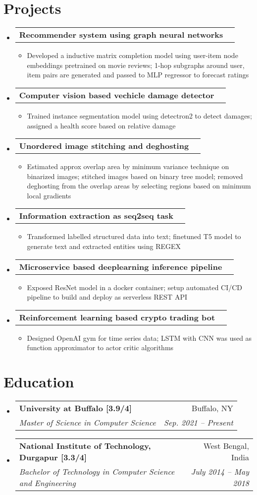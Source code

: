 \documentclass[letterpaper,10pt]{article}
\makeatletter
\newcommand{\resumeItemClean}[1]{
    \item\small{
        {#1 \vspace{-2pt}}
    }
}
\newcommand{\resumeSubheading}[4]{
  \vspace{-1pt}\item
    \begin{tabular*}{0.97\textwidth}[t]{l@{\extracolsep{\fill}}r}
      \textbf{#1} & #2 \\
      \textit{\small#3} & \textit{\small #4} \\
    \end{tabular*}\vspace{-5pt}
}
\newcommand{\projectheading}[3]{
    \vspace{-1pt}\item
        \begin{tabular*}{0.97\textwidth}{l@{\extracolsep{\fill}}r}
            \textbf{#1} & \textbf{#2} #3\\
    \end{tabular*}\vspace{-5pt}
}
\newcommand{\resumeSubHeadingListStart}{\begin{itemize}[leftmargin=*]}
\newcommand{\resumeSubHeadingListEnd}{\end{itemize}}
\newcommand{\resumeItemListStart}{\begin{itemize}}
\newcommand{\resumeItemListEnd}{\end{itemize}\vspace{-5pt}}
\makeatother
\begin{document}
\section{Projects}
    \resumeSubHeadingListStart
        \projectheading{Recommender system using graph neural networks}{}{}
            \resumeItemListStart
                \resumeItemClean
                    {Developed a inductive matrix completion model using user-item node embeddings pretrained on movie reviews; 1-hop subgraphs around user, item pairs are generated and passed to MLP regressor to forecast ratings}
            \resumeItemListEnd
        \projectheading{Computer vision based vechicle damage detector}{}{}
            \resumeItemListStart
                \resumeItemClean
                    {Trained instance segmentation model using detectron2 to detect damages; assigned a health score based on relative damage}
            \resumeItemListEnd
        \projectheading{Unordered image stitching and deghosting}{}{}
            \resumeItemListStart
                \resumeItemClean
                    {Estimated approx overlap area by minimum variance technique on binarized images; stitched images based on binary tree model; removed deghosting from the overlap areas by selecting regions based on minimum local gradients}
            \resumeItemListEnd
        \projectheading{Information extraction as seq2seq task}{}{}
            \resumeItemListStart
                \resumeItemClean
                    {Transformed labelled structured data into text; finetuned T5 model to generate text and extracted entities using REGEX}
            \resumeItemListEnd
        \projectheading{Microservice based deeplearning inference pipeline}{}{}
            \resumeItemListStart
                \resumeItemClean
                    {Exposed ResNet model in a docker container; setup automated CI/CD pipeline to build and deploy as serverless REST API}
            \resumeItemListEnd
        \projectheading{Reinforcement learning based crypto trading bot}{}{}
            \resumeItemListStart
                \resumeItemClean
                    {Designed OpenAI gym for time series data; LSTM with CNN was used as function approximator to actor critic algorithms}
            \resumeItemListEnd
    \resumeSubHeadingListEnd
    
\section{Education}
    \resumeSubHeadingListStart
        \resumeSubheading
          {University at Buffalo [3.9/4]}{Buffalo, NY}
          {Master of Science in Computer Science}{Sep. 2021 -- Present}
        \resumeSubheading
          {National Institute of Technology, Durgapur [3.3/4]}{West Bengal, India}
          {Bachelor of Technology in Computer Science and Engineering}{July 2014 -- May 2018}
    \resumeSubHeadingListEnd
    
\end{document}
